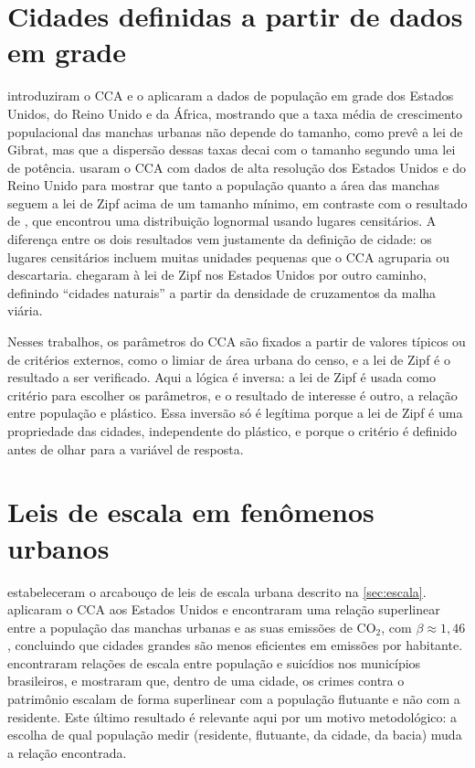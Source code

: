 \section{Cidades definidas a partir de dados em grade}
\label{sec:rel-cidades}

 introduziram o CCA e o aplicaram a dados de população em grade dos Estados Unidos, do Reino Unido e da África, mostrando que a taxa média de crescimento populacional das manchas urbanas não depende do tamanho, como prevê a lei de Gibrat, mas que a dispersão dessas taxas decai com o tamanho segundo uma lei de potência.  usaram o CCA com dados de alta resolução dos Estados Unidos e do Reino Unido para mostrar que tanto a população quanto a área das manchas seguem a lei de Zipf acima de um tamanho mínimo, em contraste com o resultado de , que encontrou uma distribuição lognormal usando lugares censitários. A diferença entre os dois resultados vem justamente da definição de cidade: os lugares censitários incluem muitas unidades pequenas que o CCA agruparia ou descartaria.  chegaram à lei de Zipf nos Estados Unidos por outro caminho, definindo ``cidades naturais'' a partir da densidade de cruzamentos da malha viária.

Nesses trabalhos, os parâmetros do CCA são fixados a partir de valores típicos ou de critérios externos, como o limiar de área urbana do censo, e a lei de Zipf é o resultado a ser verificado. Aqui a lógica é inversa: a lei de Zipf é usada como critério para escolher os parâmetros, e o resultado de interesse é outro, a relação entre população e plástico. Essa inversão só é legítima porque a lei de Zipf é uma propriedade das cidades, independente do plástico, e porque o critério é definido antes de olhar para a variável de resposta.

\section{Leis de escala em fenômenos urbanos}
\label{sec:rel-escala}

 estabeleceram o arcabouço de leis de escala urbana descrito na \autoref{sec:escala}.  aplicaram o CCA aos Estados Unidos e encontraram uma relação superlinear entre a população das manchas urbanas e as suas emissões de CO$_2$, com $\beta \approx 1{,}46$, concluindo que cidades grandes são menos eficientes em emissões por habitante.  encontraram relações de escala entre população e suicídios nos municípios brasileiros, e  mostraram que, dentro de uma cidade, os crimes contra o patrimônio escalam de forma superlinear com a população flutuante e não com a residente. Este último resultado é relevante aqui por um motivo metodológico: a escolha de qual população medir (residente, flutuante, da cidade, da bacia) muda a relação encontrada.

